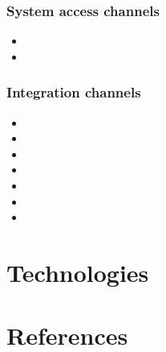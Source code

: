 \documentclass[a4paper]{article}
\begin{document}
\subsubsection{System access channels }

\begin{itemize}
\item
\item 
\end{itemize}

\subsubsection{Integration channels }
\begin{itemize}
\item
\item 
\item 
\item 
\item 
\item 
\item 
\end{itemize}

\section{Technologies}

\section{References}
\end{document}

